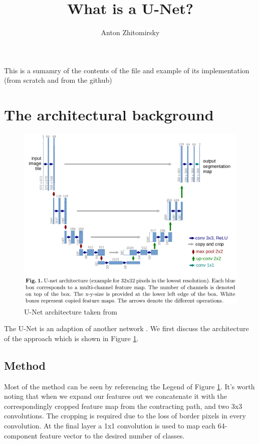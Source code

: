 \documentclass[11pt]{article}
\title{What is a U-Net?}
\author{Anton Zhitomirsky}
\begin{document}
\maketitle

This is a sumamry of the contents of the file \cite{U-Net} and example of its implementation (from scratch and from the github)

\section{The architectural background} 

\begin{figure}[H]
    \centering
    \includegraphics[width=\linewidth]{images/u-net.png}
    \caption{U-Net architecture taken from \cite{U-Net}}
    \label{fig:u-net-architecture}
\end{figure}

The U-Net is an adaption of another network \cite{fully-CNNs-for-semantic-segmentation}. We first discuss the architecture of the approach which is shown in Figure \ref{fig:u-net-architecture}.

\subsection{Method}

Most of the method can be seen by referencing the Legend of Figure \ref{fig:u-net-architecture}. It's worth noting that when we expand our features out we concatenate it with the correspondingly cropped feature map from the contracting path, and two 3x3 convolutions. The cropping is required due to the loss of border pixels in every convolution. At the final layer a 1x1 convolution is used to map each 64-component feature vector to the desired number of classes.
\end{document}
